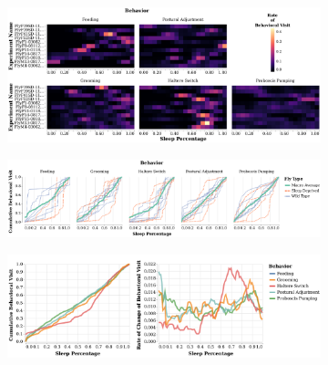 \begin{figure}[ht!]
	\centering
	\begin{subfigure}[ht!]{0.975\linewidth}
		\centering\includegraphics[width=\linewidth]{figures/Heatmap_BehavioralUsage-Ann.pdf}
		\caption{}
	\end{subfigure}%

	\centering
	\begin{subfigure}[ht!]{0.975\linewidth}
		\centering\includegraphics[width=\linewidth]{figures/CumulativeLine_BehavioralUsage-Ann.pdf}
		\caption{}
	\end{subfigure}%

	\centering
	\begin{subfigure}[ht!]{0.775\linewidth}
		\centering\includegraphics[width=\linewidth]{figures/MeanCumRofC_BehavioralUsage-Ann.pdf}
		\caption{}
	\end{subfigure}%
\end{figure}
